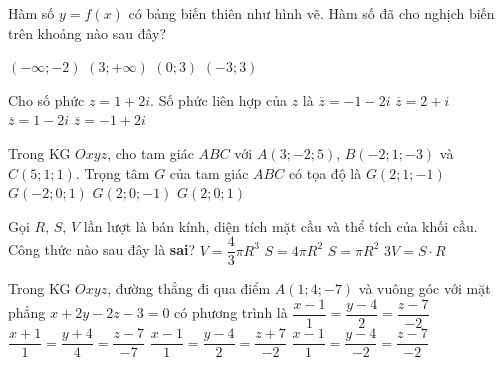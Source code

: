 \begin{ex}%
	Hàm số $y=f(x)$ có bảng biến thiên như hình vẽ. Hàm số đã cho nghịch biến trên khoảng nào sau đây?
	\begin{center}
	\end{center}
	\choice
	{$(-\infty;-2)$}
	{$(3;+\infty)$}
	{\True $(0;3)$}
	{$(-3;3)$}
\end{ex}

\begin{ex}%
	Cho số phức $z=1+2i$. Số phức liên hợp của $z$ là
	\choice
	{$\overline{z}=-1-2i$}
	{$\overline{z}=2+i$}
	{\True $\overline{z}=1-2i$}
	{$\overline{z}=-1+2i$}
\end{ex}

\begin{ex}%
	Trong KG $Oxyz$, cho tam giác $ABC$ với $A(3;-2;5)$, $B(-2;1;-3)$ và $C(5;1;1)$. Trọng tâm $G$ của tam giác $ABC$ có tọa độ là
	\choice
	{$G(2;1;-1)$}
	{$G(-2;0;1)$}
	{$G(2;0;-1)$}
	{\True $G(2;0;1)$}
\end{ex}

\begin{ex}%
	Gọi $R,\,S,\,V$ lần lượt là bán kính, diện tích mặt cầu và thể tích của khối cầu. Công thức nào sau đây là \textbf{sai}?
	\choice
	{$V=\dfrac{4}{3}\pi R^3$}
	{$S=4\pi R^2$}
	{\True $S=\pi R^2$}
	{$3V=S\cdot R$}
	\loigiai{
		
	} 
\end{ex}

\begin{ex}%
	Trong KG $Oxyz$, đường thẳng đi qua điểm $A(1;4;-7)$ và vuông góc với mặt phẳng $x+2y-2z-3=0$ có phương trình là
	\choice
	{$\dfrac{x-1}{1}=\dfrac{y-4}{2}=\dfrac{z-7}{-2}$}
	{$\dfrac{x+1}{1}=\dfrac{y+4}{4}=\dfrac{z-7}{-7}$}
	{\True $\dfrac{x-1}{1}=\dfrac{y-4}{2}=\dfrac{z+7}{-2}$}
	{$\dfrac{x-1}{1}=\dfrac{y-4}{-2}=\dfrac{z-7}{-2}$}
\end{ex}

